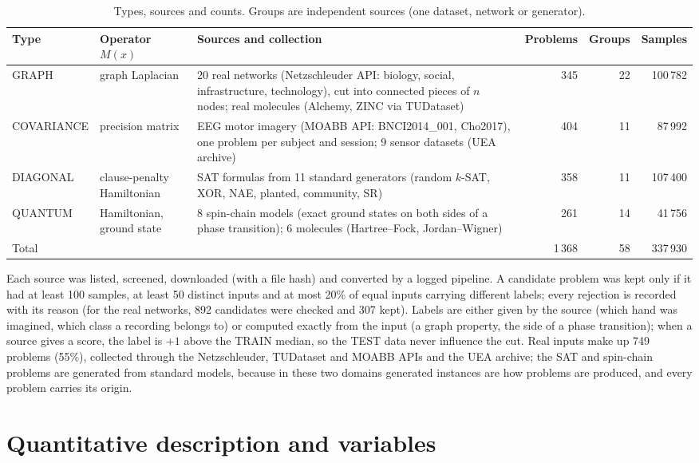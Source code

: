 \documentclass[10pt,a4paper]{article}
\begin{document}
\begin{table}[h]
\centering\small
\caption{Types, sources and counts. Groups are independent sources (one dataset, network or generator).}\label{tab:types}
\begin{tabularx}{\linewidth}{@{}l l Y r r r@{}}
\toprule
Type & Operator $M(x)$ & Sources and collection & Problems & Groups & Samples\\
\midrule
GRAPH & graph Laplacian & 20 real networks (Netzschleuder API: biology, social, infrastructure, technology), cut into connected pieces of $n$ nodes; real molecules (Alchemy, ZINC via TUDataset) & 345 & 22 & 100\,782\\
COVARIANCE & precision matrix & EEG motor imagery (MOABB API: BNCI2014\_001, Cho2017), one problem per subject and session; 9 sensor datasets (UEA archive) & 404 & 11 & 87\,992\\
DIAGONAL & clause-penalty Hamiltonian & SAT formulas from 11 standard generators (random $k$-SAT, XOR, NAE, planted, community, SR) & 358 & 11 & 107\,400\\
QUANTUM & Hamiltonian, ground state & 8 spin-chain models (exact ground states on both sides of a phase transition); 6 molecules (Hartree--Fock, Jordan--Wigner) & 261 & 14 & 41\,756\\
\midrule
Total & & & 1\,368 & 58 & 337\,930\\
\bottomrule
\end{tabularx}
\end{table}

Each source was listed, screened, downloaded (with a file hash) and converted by a logged pipeline. A
candidate problem was kept only if it had at least 100 samples, at least 50 distinct inputs and at most 20\%
of equal inputs carrying different labels; every rejection is recorded with its reason (for the real
networks, 892 candidates were checked and 307 kept). Labels are either given by the source (which hand was
imagined, which class a recording belongs to) or computed exactly from the input (a graph property, the side
of a phase transition); when a source gives a score, the label is $+1$ above the TRAIN median, so the TEST data
never influence the cut. Real inputs make up 749 problems (55\%), collected through the Netzschleuder,
TUDataset and MOABB APIs and the UEA archive; the SAT and spin-chain problems are generated from standard
models, because in these two domains generated instances are how problems are produced, and every problem
carries its origin.

\section{Quantitative description and variables}
\end{document}
